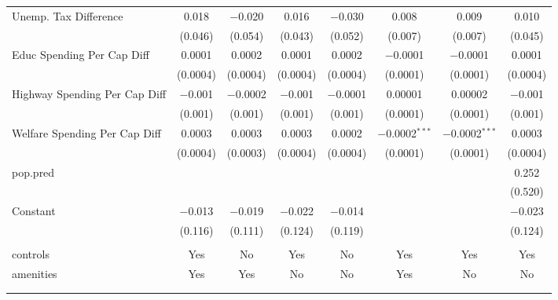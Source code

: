 \begin{table}[!htbp]
\begin{tabular}{@{\extracolsep{5pt}}lccccccc}
  Unemp. Tax Difference & 0.018 & $-$0.020 & 0.016 & $-$0.030 & 0.008 & 0.009 & 0.010 \\ 
  & (0.046) & (0.054) & (0.043) & (0.052) & (0.007) & (0.007) & (0.045) \\ 
  Educ Spending Per Cap Diff & 0.0001 & 0.0002 & 0.0001 & 0.0002 & $-$0.0001 & $-$0.0001 & 0.0001 \\ 
  & (0.0004) & (0.0004) & (0.0004) & (0.0004) & (0.0001) & (0.0001) & (0.0004) \\ 
  Highway Spending Per Cap Diff & $-$0.001 & $-$0.0002 & $-$0.001 & $-$0.0001 & 0.00001 & 0.00002 & $-$0.001 \\ 
  & (0.001) & (0.001) & (0.001) & (0.001) & (0.0001) & (0.0001) & (0.001) \\ 
  Welfare Spending Per Cap Diff & 0.0003 & 0.0003 & 0.0003 & 0.0002 & $-$0.0002$^{***}$ & $-$0.0002$^{***}$ & 0.0003 \\ 
  & (0.0004) & (0.0003) & (0.0004) & (0.0004) & (0.0001) & (0.0001) & (0.0004) \\ 
  pop.pred &  &  &  &  &  &  & 0.252 \\ 
  &  &  &  &  &  &  & (0.520) \\ 
  Constant & $-$0.013 & $-$0.019 & $-$0.022 & $-$0.014 &  &  & $-$0.023 \\ 
  & (0.116) & (0.111) & (0.124) & (0.119) &  &  & (0.124) \\ 
 \hline \\[-1.8ex] 
controls & Yes & No & Yes & No & Yes & Yes & Yes \\ 
amenities & Yes & Yes & No & No & Yes & No & No \\ 
\hline \\[-1.8ex] 
\hline 
\hline \\[-1.8ex] 
\end{tabular} 
\end{table} 
